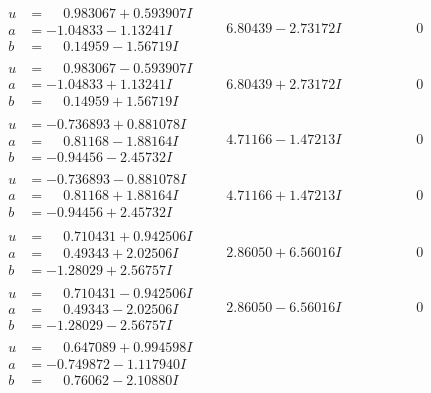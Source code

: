 \documentclass[1p]{elsarticle_modified}
\theoremstyle{definition}
\begin{document}
$$\begin{array}{c|c|c}
\begin{aligned}
u &= \phantom{-}0.983067 + 0.593907 I \\
a &= -1.04833 - 1.13241 I \\
b &= \phantom{-}0.14959 - 1.56719 I\end{aligned}
 & \phantom{-}6.80439 - 2.73172 I & \phantom{-0.000000 } 0 \\ \hline\begin{aligned}
u &= \phantom{-}0.983067 - 0.593907 I \\
a &= -1.04833 + 1.13241 I \\
b &= \phantom{-}0.14959 + 1.56719 I\end{aligned}
 & \phantom{-}6.80439 + 2.73172 I & \phantom{-0.000000 } 0 \\ \hline\begin{aligned}
u &= -0.736893 + 0.881078 I \\
a &= \phantom{-}0.81168 - 1.88164 I \\
b &= -0.94456 - 2.45732 I\end{aligned}
 & \phantom{-}4.71166 - 1.47213 I & \phantom{-0.000000 } 0 \\ \hline\begin{aligned}
u &= -0.736893 - 0.881078 I \\
a &= \phantom{-}0.81168 + 1.88164 I \\
b &= -0.94456 + 2.45732 I\end{aligned}
 & \phantom{-}4.71166 + 1.47213 I & \phantom{-0.000000 } 0 \\ \hline\begin{aligned}
u &= \phantom{-}0.710431 + 0.942506 I \\
a &= \phantom{-}0.49343 + 2.02506 I \\
b &= -1.28029 + 2.56757 I\end{aligned}
 & \phantom{-}2.86050 + 6.56016 I & \phantom{-0.000000 } 0 \\ \hline\begin{aligned}
u &= \phantom{-}0.710431 - 0.942506 I \\
a &= \phantom{-}0.49343 - 2.02506 I \\
b &= -1.28029 - 2.56757 I\end{aligned}
 & \phantom{-}2.86050 - 6.56016 I & \phantom{-0.000000 } 0 \\ \hline\begin{aligned}
u &= \phantom{-}0.647089 + 0.994598 I \\
a &= -0.749872 - 1.117940 I \\
b &= \phantom{-}0.76062 - 2.10880 I\end{aligned}

\end{array}$$
\end{document}
